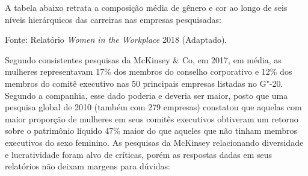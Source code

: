 A tabela abaixo retrata a composição média de gênero e cor ao longo de
seis níveis hierárquicos das carreiras nas empresas pesquisadas:

\medskip

\noindent{}

\begin{center}
{\scriptsize{Fonte: Relatório \emph{Women in the Workplace} 2018 (Adaptado).}}
\end{center}

\bigskip

Segundo consistentes pesquisas da McKinsey \& Co, em 2017, em média, as
mulheres representavam 17\% dos membros do conselho corporativo e 12\%
dos membros do comitê executivo nas 50 principais empresas listadas no
G"-20. Segundo a companhia, esse dado poderia e deveria ser maior, posto
que uma pesquisa global de 2010 (também com 279 empresas) constatou que
aquelas com maior proporção de mulheres em seus comitês executivos
obtiveram um retorno sobre o patrimônio líquido 47\% maior do que
aqueles que não tinham membros executivos do sexo feminino. As pesquisas
da McKinsey relacionando diversidade e lucratividade foram alvo de
críticas, porém as respostas dadas em seus relatórios não deixam margens
para dúvidas:

